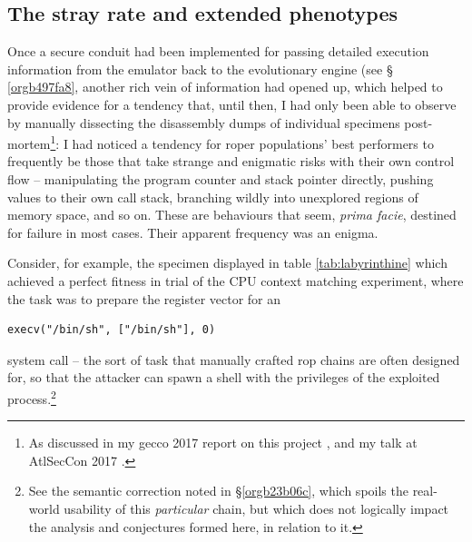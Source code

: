 \documentclass[12pt,glossary]{dalthesis}
\begin{document}
\subsection{The stray rate and extended phenotypes}
\label{sec:org2b355f4}
\label{org36c78c3}

Once a secure conduit had been implemented for passing detailed execution
information from the emulator back to the evolutionary engine (see \S
\ref{orgb497fa8},
another rich vein of information had opened up, which helped to provide evidence for a
tendency that, until then, I had only been able to observe by manually
dissecting the disassembly dumps of individual specimens post-mortem\footnote{As discussed in my \gls{gecco} 2017 report on this project \cite{fraser17_gecco},
  and my talk at AtlSecCon 2017 \cite{fraser17_atlseccon}.}: I had noticed a tendency for \gls{roper} populations' best
performers to frequently be those that take strange and enigmatic risks with their own
control flow -- manipulating the program counter and stack pointer directly,
pushing values to their own call stack, branching wildly into unexplored regions
of memory space, and so on. These are behaviours that seem, \emph{prima facie}, destined
for failure in most cases. Their apparent frequency was an enigma. 

Consider, for example, the specimen displayed in 
table \ref{tab:labyrinthine} which
achieved a perfect fitness in trial of the CPU context matching experiment,
where the task was to prepare the register vector for an
\begin{verbatim}
execv("/bin/sh", ["/bin/sh"], 0)
\end{verbatim}
system call -- the sort of task that manually crafted \gls{rop} chains are often
designed for, so that the attacker can spawn a shell with the privileges of the
exploited process.\footnote{See the semantic correction noted in \S \ref{orgb23b06c}, which 
  spoils the real-world usability of this \emph{particular} chain, but which
  does not logically impact the analysis and conjectures formed here,
  in relation to it.}
\end{document}
